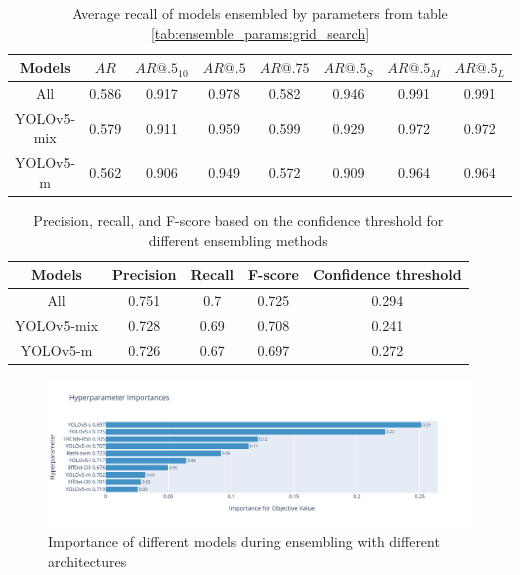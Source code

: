 \begin{table}[h]
    \centering
    \begin{tabular}{|c|c|c|c|c|c|c|c|}
        \hline
        Models     & $AR$  & $AR@.5_{10}$ & $AR@.5$ & $AR@.75$ & $AR@.5_S$ & $AR@.5_M$ & $AR@.5_L$ \\ \hline
        All        & 0.586 & 0.917        & 0.978   & 0.582    & 0.946     & 0.991     & 0.991     \\ \hline
        YOLOv5-mix & 0.579 & 0.911        & 0.959   & 0.599    & 0.929     & 0.972     & 0.972     \\ \hline
        YOLOv5-m   & 0.562 & 0.906        & 0.949   & 0.572    & 0.909     & 0.964     & 0.964     \\ \hline
    \end{tabular}
    \caption{Average recall of models ensembled by parameters from table \ref{tab:ensemble_params:grid_search}}
    \label{tab:recall:grid_search}
\end{table}


\begin{table}[h]
    \begin{tabular}{|c|c|c|c|c|}
        \hline
        Models     & Precision & Recall & F-score & Confidence threshold \\ \hline
        All        & 0.751     & 0.7    & 0.725   & 0.294                \\ \hline
        YOLOv5-mix & 0.728     & 0.69   & 0.708   & 0.241                \\ \hline
        YOLOv5-m   & 0.726     & 0.67   & 0.697   & 0.272                \\ \hline
    \end{tabular}
    \caption{Precision, recall, and F-score based on the confidence threshold for different ensembling methods}
    \label{tab:ensembling_prf:grid_search}
\end{table}

\begin{figure}
    \centering
    \includegraphics[width=\linewidth]{images/ensemble_all_importance.pdf}
    \caption{Importance of different models during ensembling with different architectures}
\end{figure}

